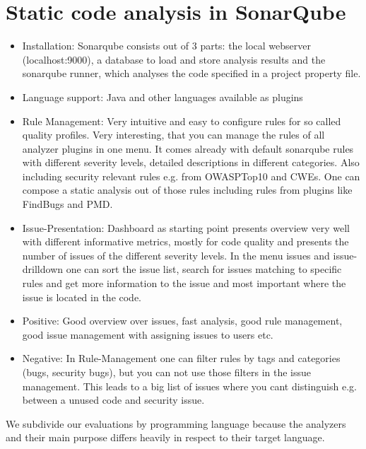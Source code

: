 \documentclass[conference]{IEEEtran}
\begin{document}
\section{Static code analysis in SonarQube}
\label{sec:static_code_analysis_sonarqube}
\begin{itemize}
\item Installation: Sonarqube consists out of 3 parts: the local webserver (localhost:9000), a database to load and store analysis results and the sonarqube runner, which analyses the code specified in a project property file.

\item Language support: Java and other languages available as plugins

\item Rule Management: Very intuitive and easy to configure rules for so called quality profiles. Very interesting, that you can manage the rules of all analyzer plugins in one menu. It comes already with default sonarqube rules with different severity levels, detailed descriptions in different categories. Also including security relevant rules e.g. from OWASPTop10 and CWEs. One can compose a static analysis out of those rules including rules from plugins like FindBugs and PMD.

\item Issue-Presentation: Dashboard as starting point presents overview very well with different informative metrics, mostly for code quality and presents the number of issues of the different severity levels.
In the menu issues and issue-drilldown one can sort the issue list, search for issues matching to specific rules and get more information to the issue and most important where the issue is located in the code.

\item Positive: Good overview over issues, fast analysis, good rule management, good issue management with assigning issues to users etc.

\item Negative: In Rule-Management one can filter rules by tags and categories (bugs, security bugs), but you can not use those filters in the issue management. This leads to a big list of issues where you cant distinguish e.g. between a unused code and security issue.
 
\end{itemize}

We subdivide our evaluations by programming language because the analyzers and their main purpose differs heavily in respect to their target language.
\end{document}
